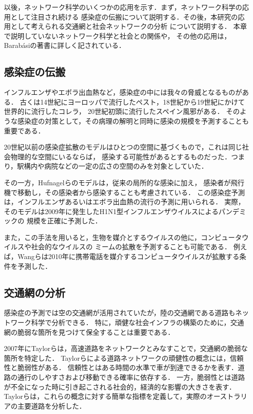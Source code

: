 以後，ネットワーク科学のいくつかの応用を示す．まず，ネットワーク科学の応用として注目され続ける
感染症の伝搬について説明する．その後，本研究の応用として考えられる交通網と社会ネットワークの分析
について説明する．
本章で説明していないネットワーク科学と社会との関係や，
その他の応用は，Barab{\'{a}}siの著書\cite{Barabasi2016}に詳しく記されている．

\subsection{感染症の伝搬}

インフルエンザやエボラ出血熱など，感染症の中には我々の脅威となるものがある．
古くは14世紀にヨーロッパで流行したペスト，18世紀から19世紀にかけて世界的に流行したコレラ，
20世紀初頭に流行したスペイン風邪がある．
そのような感染症の対策として，その病理の解明と同時に感染の規模を予測することも重要である．

20世紀以前の感染症拡散のモデルはひとつの空間に基づくもので，これは同じ社会物理的な空間にいるならば，
感染する可能性があるとするものだった．つまり，駅構内や病院などの一定の広さの空間のみを対象としていた．

その一方，Hufnagelらのモデル\cite{Hufnagel2004}は，従来の局所的な感染に加え，
感染者が飛行機で移動し，その感染者から感染することも考慮されている．
この感染症予測は，インフルエンザあるいはエボラ出血熱の流行の予測に用いられる．
実際，そのモデルは2009年に発生したH1N1型インフルエンザウイルスによるパンデミックの
規模を正確に予測した\cite{Balcan2009}．

また，この手法を用いると，生物を媒介とするウイルスの他に，コンピュータウイルスや社会的なウイルスの
ミームの拡散を予測することも可能である．
例えば，Wangらは2010年に携帯電話を媒介するコンピュータウイルスが拡散する条件を予測した\cite{Wang2009}．

\subsection{交通網の分析}

感染症の予測では空の交通網が活用されていたが，陸の交通網である道路もネットワーク科学で分析できる．
特に，頑健な社会インフラの構築のために，交通網の脆弱な箇所を見つけて保全することは重要である．

2007年にTaylorらは，高速道路をネットワークとみなすことで，交通網の脆弱な箇所を特定した\cite{Taylor2007}．
Taylorらによる道路ネットワークの頑健性の概念には，信頼性と脆弱性がある．
信頼性とはある時間の水準で車が到達できるかを表す．道路の通行のしやすさおよび移動できる確率に依存する．
一方，脆弱性とは道路が不全になった時に引き起こされる社会的，経済的な影響の大きさを表す．
Taylorらは，これらの概念に対する簡単な指標を定義して，実際のオーストラリアの主要道路を分析した．

